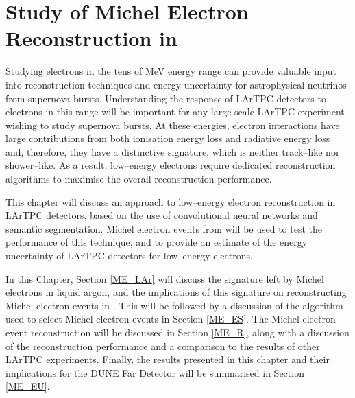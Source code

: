 \chapter{\label{ch:michel}Study of Michel Electron Reconstruction in \protodune{}}

\minitoc

\noindent
Studying electrons in the tens of MeV energy range can provide valuable input
into reconstruction techniques and energy uncertainty for astrophysical
neutrinos from supernova bursts. Understanding the response of LArTPC
detectors to electrons in this range will be important for any large scale
LArTPC experiment wishing to study supernova bursts. At these energies,
electron interactions have large contributions from both ionisation energy
loss and radiative energy loss and, therefore, they have a distinctive 
signature, which is neither track--like nor shower--like. As a result, 
low--energy electrons require dedicated reconstruction algorithms to maximise 
the overall reconstruction performance.

This chapter will discuss an approach to low--energy electron reconstruction
in LArTPC detectors, based on the use of convolutional neural networks and
semantic segmentation. Michel electron events from \protodune{} will be used
to test the performance of this technique, and to provide an estimate of the
energy uncertainty of LArTPC detectors for low--energy electrons.

In this Chapter, Section \ref{ME_LAr} will discuss the signature left by Michel
electrons in liquid argon, and the implications of this signature on
reconstructing Michel electron events in \protodune{}. This will be followed by
a discussion of the algorithm used to select Michel electron events in Section
\ref{ME_ES}. The Michel electron event reconstruction will be discussed in
Section \ref{ME_R}, along with a discussion of the reconstruction performance
and a comparison to the results of other LArTPC experiments. Finally, the
results presented in this chapter and their implications for the DUNE Far 
Detector will be summarised in Section \ref{ME_EU}.

